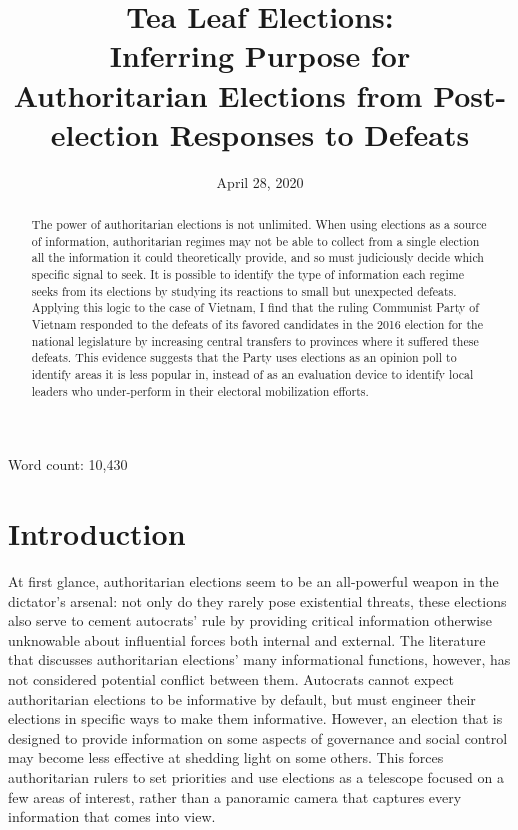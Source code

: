 \documentclass[12pt]{article}
\title{Tea Leaf Elections: \\
	Inferring Purpose for Authoritarian Elections from Post-election Responses to Defeats \\
	\vspace{2ex}
	\vphantom{Online Appendix}}
\date{April 28, 2020}
\newcommand{\1}{\mathbbm{1}}
\begin{document}
	

\maketitle
\thispagestyle{empty}
\doublespacing

\begin{abstract}
The power of authoritarian elections is not unlimited. When using elections as a source of information, authoritarian regimes may not be able to collect from a single election all the information it could theoretically provide, and so must judiciously decide which specific signal to seek. It is possible to identify the type of information each regime seeks from its elections by studying its reactions to small but unexpected defeats. Applying this logic to the case of Vietnam, I find that the ruling Communist Party of Vietnam responded to the defeats of its favored candidates in the 2016 election for the national legislature by increasing central transfers to provinces where it suffered these defeats. This evidence suggests that the Party uses elections as an opinion poll to identify areas it is less popular in, instead of as an evaluation device to identify local leaders who under-perform in their electoral mobilization efforts.
\end{abstract}

Word count: 10,430


\newpage
{}

\section{Introduction}

At first glance, authoritarian elections seem to be an all-powerful weapon in the dictator's arsenal: not only do they rarely pose existential threats, these elections also serve to cement autocrats' rule by providing critical information otherwise unknowable about influential forces both internal and external. The literature that discusses authoritarian elections' many informational functions, however, has not considered potential conflict between them. Autocrats cannot expect authoritarian elections to be informative by default, but must engineer their elections in specific ways to make them informative. However, an election that is designed to provide information on some aspects of governance and social control may become less effective at shedding light on some others. This forces authoritarian rulers to set priorities and use elections as a telescope focused on a few areas of interest, rather than a panoramic camera that captures every information that comes into view.
\end{document}
